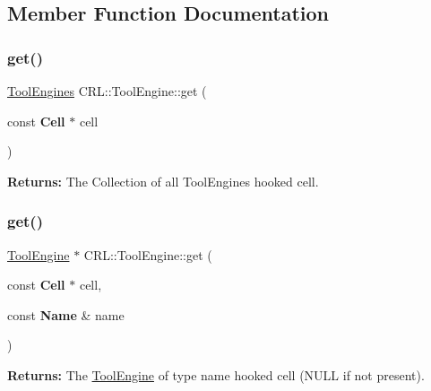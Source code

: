 \subsection{Member Function Documentation}
\mbox{\label{classCRL_1_1ToolEngine_afb78e8f180ecc36ff8fa4e91e7885d37}} 
\subsubsection{\texorpdfstring{get()}{get()}\hspace{0.1cm}{\footnotesize\ttfamily [1/2]}}
{\footnotesize\ttfamily \mbox{\hyperlink{namespaceCRL_ae49bc0c5f113bba964680768556dd1b3}{Tool\+Engines}} C\+R\+L\+::\+Tool\+Engine\+::get (\begin{DoxyParamCaption}\item[{const \textbf{ Cell} $\ast$}]{cell }\end{DoxyParamCaption})\hspace{0.3cm}{\ttfamily [static]}}

{\bfseries Returns\+:} The Collection of all Tool\+Engines hooked {\ttfamily cell}. \mbox{\label{classCRL_1_1ToolEngine_a1c2261333735f6fd59b51708516b8b23}} 
\subsubsection{\texorpdfstring{get()}{get()}\hspace{0.1cm}{\footnotesize\ttfamily [2/2]}}
{\footnotesize\ttfamily \mbox{\hyperlink{classCRL_1_1ToolEngine}{Tool\+Engine}} $\ast$ C\+R\+L\+::\+Tool\+Engine\+::get (\begin{DoxyParamCaption}\item[{const \textbf{ Cell} $\ast$}]{cell,  }\item[{const \textbf{ Name} \&}]{name }\end{DoxyParamCaption})\hspace{0.3cm}{\ttfamily [static]}}

{\bfseries Returns\+:} The \mbox{\hyperlink{classCRL_1_1ToolEngine}{Tool\+Engine}} of type {\ttfamily name} hooked {\ttfamily cell} ({\ttfamily N\+U\+LL} if not present). \mbox{\label{classCRL_1_1ToolEngine_a3ce4d591198922c56a328bced79dd921}} 
